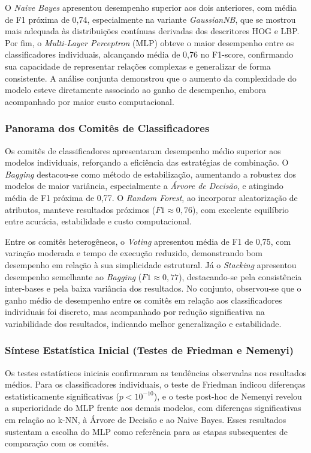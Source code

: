 \documentclass[12pt]{article}
\begin{document}
O \textit{Naive Bayes} apresentou desempenho superior aos dois anteriores, com média de F1 próxima de 0,74, especialmente na variante \textit{GaussianNB}, que se mostrou mais adequada às distribuições contínuas derivadas dos descritores HOG e LBP. Por fim, o \textit{Multi-Layer Perceptron} (MLP) obteve o maior desempenho entre os classificadores individuais, alcançando média de 0,76 no F1-score, confirmando sua capacidade de representar relações complexas e generalizar de forma consistente. A análise conjunta demonstrou que o aumento da complexidade do modelo esteve diretamente associado ao ganho de desempenho, embora acompanhado por maior custo computacional.

\subsubsection{Panorama dos Comitês de Classificadores}

Os comitês de classificadores apresentaram desempenho médio superior aos modelos individuais, reforçando a eficiência das estratégias de combinação. O \textit{Bagging} destacou-se como método de estabilização, aumentando a robustez dos modelos de maior variância, especialmente a \textit{Árvore de Decisão}, e atingindo média de F1 próxima de 0,77. O \textit{Random Forest}, ao incorporar aleatorização de atributos, manteve resultados próximos ($F1 \approx 0,76$), com excelente equilíbrio entre acurácia, estabilidade e custo computacional.

Entre os comitês heterogêneos, o \textit{Voting} apresentou média de F1 de 0,75, com variação moderada e tempo de execução reduzido, demonstrando bom desempenho em relação à sua simplicidade estrutural. Já o \textit{Stacking} apresentou desempenho semelhante ao \textit{Bagging} ($F1 \approx 0,77$), destacando-se pela consistência inter-bases e pela baixa variância dos resultados. No conjunto, observou-se que o ganho médio de desempenho entre os comitês em relação aos classificadores individuais foi discreto, mas acompanhado por redução significativa na variabilidade dos resultados, indicando melhor generalização e estabilidade.


\subsubsection{Síntese Estatística Inicial (Testes de Friedman e Nemenyi)}

Os testes estatísticos iniciais confirmaram as tendências observadas nos resultados médios. Para os classificadores individuais, o teste de Friedman indicou diferenças estatisticamente significativas ($p < 10^{-10}$), e o teste post-hoc de Nemenyi revelou a superioridade do MLP frente aos demais modelos, com diferenças significativas em relação ao k-NN, à Árvore de Decisão e ao Naive Bayes. Esses resultados sustentam a escolha do MLP como referência para as etapas subsequentes de comparação com os comitês.
\end{document}
